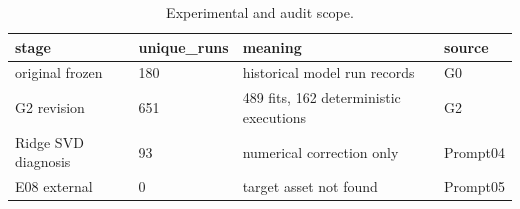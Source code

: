 \begin{table}[!htbp]
\centering
\caption{Experimental and audit scope.}
\begin{tabular}{llll}
\hline
stage & unique\_runs & meaning & source \\ 
\hline
original frozen & 180 & historical model run records & G0 \\
G2 revision & 651 & 489 fits, 162 deterministic executions & G2 \\
Ridge SVD diagnosis & 93 & numerical correction only & Prompt04 \\
E08 external & 0 & target asset not found & Prompt05 \\
\hline
\end{tabular}
\end{table}
